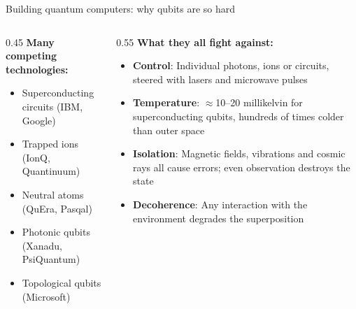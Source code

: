\ifdefined\PRESENTATION\else\PassOptionsToClass{handout}{beamer}\fi\documentclass[aspectratio=169, lualatex]{beamer}
\begin{document}
\begin{frame}{Building quantum computers: why qubits are so hard}
	\begin{columns}[c]
		\begin{column}{0.45\textwidth}
			\textbf{Many competing technologies:}
			\begin{itemize}
				\item Superconducting circuits (IBM, Google)
				\item Trapped ions (IonQ, Quantinuum)
				\item Neutral atoms (QuEra, Pasqal)
				\item Photonic qubits (Xanadu, PsiQuantum)
				\item Topological qubits (Microsoft)
			\end{itemize}
		\end{column}
		\begin{column}{0.55\textwidth}
			\textbf{What they all fight against:}
			\begin{itemize}
				\item \textbf{Control}: Individual photons, ions or circuits, steered with lasers and microwave pulses
				\item \textbf{Temperature}: $\approx$10--20 millikelvin for superconducting qubits, hundreds of times colder than outer space
				\item \textbf{Isolation}: Magnetic fields, vibrations and cosmic rays all cause errors; even observation destroys the state
				\item \textbf{Decoherence}: Any interaction with the environment degrades the superposition
			\end{itemize}
		\end{column}
	\end{columns}
\end{frame}
\end{document}
